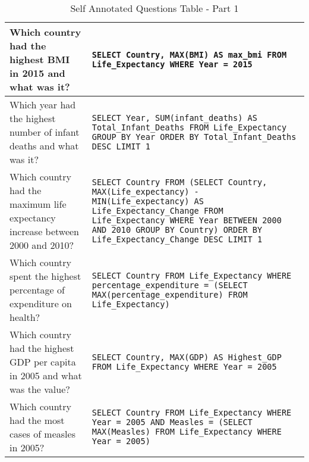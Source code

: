 \documentclass[11pt]{article}
\begin{document}
\begin{table*}[t]
\begin{tabular}{|p{}|p{}|}
Which country had the highest BMI in 2015 and what was it? & \texttt{SELECT Country, MAX(BMI) AS max\_bmi FROM Life\_Expectancy WHERE Year = 2015} \\ \hline
Which year had the highest number of infant deaths and what was it? & \texttt{SELECT Year, SUM(infant\_deaths) AS Total\_Infant\_Deaths FROM Life\_Expectancy GROUP BY Year ORDER BY Total\_Infant\_Deaths DESC LIMIT 1} \\ \hline
Which country had the maximum life expectancy increase between 2000 and 2010? & \texttt{SELECT Country FROM (SELECT Country, MAX(Life\_expectancy) - MIN(Life\_expectancy) AS Life\_Expectancy\_Change FROM Life\_Expectancy WHERE Year BETWEEN 2000 AND 2010 GROUP BY Country) ORDER BY Life\_Expectancy\_Change DESC LIMIT 1} \\ \hline
Which country spent the highest percentage of expenditure on health? & \texttt{SELECT Country FROM Life\_Expectancy WHERE percentage\_expenditure = (SELECT MAX(percentage\_expenditure) FROM Life\_Expectancy)} \\ \hline
Which country had the highest GDP per capita in 2005 and what was the value? & \texttt{SELECT Country, MAX(GDP) AS Highest\_GDP FROM Life\_Expectancy WHERE Year = 2005} \\ \hline
Which country had the most cases of measles in 2005? & \texttt{SELECT Country FROM Life\_Expectancy WHERE Year = 2005 AND Measles = (SELECT MAX(Measles) FROM Life\_Expectancy WHERE Year = 2005)} \\ \hline
\end{tabular}
\caption{Self Annotated Questions Table - Part 1}
\label{append:2}
\end{table*}

\newpage
\end{document}
